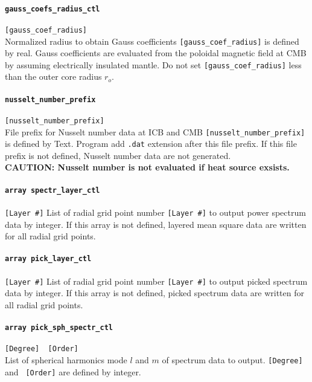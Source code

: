 \paragraph{\tt gauss\_coefs\_radius\_ctl}
\label{href_t:gauss_coefs_radius_ctl}
\verb|[gauss_coef_radius]| \\
Normalized radius to obtain Gauss coefficients \verb|[gauss_coef_radius]| is defined by real. Gauss coefficients are evaluated from the poloidal magnetic field at CMB by assuming electrically insulated mantle. Do not set \verb|[gauss_coef_radius]| less than the outer core radius $r_{o}$.

\paragraph{\tt nusselt\_number\_prefix}
\label{href_t:gauss_coefs_prefix}
\verb|[nusselt_number_prefix]| \\
File prefix for Nusselt number data at ICB and CMB \verb|[nusselt_number_prefix]| is defined by Text. Program add {\tt .dat} extension after this file prefix. If this file prefix is not defined, Nusselt number data are not generated. \\
{\bf CAUTION: Nusselt number is not evaluated if heat source exsists.}

\paragraph{\tt array spectr\_layer\_ctl}
\label{href_t:spectr_layer_ctl}
\verb|[Layer #]|
List of radial grid point number \verb|[Layer #]| to output power spectrum data by integer. If this array is not defined, layered mean square data are written for all radial grid points.

\paragraph{\tt array pick\_layer\_ctl}
\label{href_t:pick_layer_ctl}
\verb|[Layer #]|
List of radial grid point number \verb|[Layer #]| to output picked spectrum data by integer. If this array is not defined, picked spectrum data are written for all radial grid points.

\paragraph{\tt array pick\_sph\_spectr\_ctl}
\label{href_t:pick_sph_spectr_ctl}
\verb|[Degree]  [Order]| \\
List of spherical harmonics mode $l$ and $m$ of spectrum data to output. \verb|[Degree]| and \verb| [Order]| are defined by integer.

